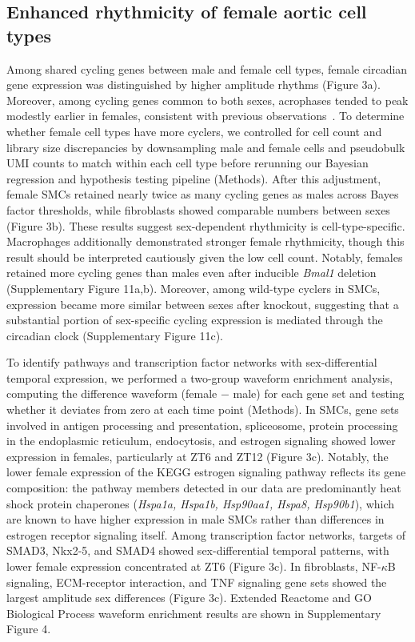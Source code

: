 \documentclass[12pt]{article}
\begin{document}
\subsection*{Enhanced rhythmicity of female aortic cell types}

Among shared cycling genes between male and female cell types, female circadian gene expression was
distinguished by higher amplitude rhythms (Figure 3a). Moreover, among cycling
genes common to both sexes, acrophases tended to peak modestly earlier in females, consistent with
previous observations~\cite{ref21}. To determine whether female cell types have more cyclers, we controlled
for cell count and library size discrepancies by downsampling male and female cells and pseudobulk
UMI counts to match within each cell type before rerunning our Bayesian regression and hypothesis
testing pipeline (Methods). After this adjustment, female SMCs retained
nearly twice as many cycling genes as males across Bayes factor thresholds, while fibroblasts showed
comparable numbers between sexes (Figure 3b). These results suggest sex-dependent
rhythmicity is cell-type-specific. Macrophages additionally demonstrated stronger female
rhythmicity, though this result should be interpreted cautiously given the low cell count. Notably,
females retained more cycling genes than males even after inducible \textit{Bmal1} deletion
(Supplementary Figure 11a,b). Moreover, among wild-type cyclers in SMCs, expression became
more similar between sexes after knockout, suggesting that a substantial portion of sex-specific
cycling expression is mediated through the circadian clock (Supplementary Figure 11c).

To identify pathways and transcription factor networks with sex-differential temporal expression, we
performed a two-group waveform enrichment analysis, computing the difference waveform (female $-$
male) for each gene set and testing whether it deviates from zero at each time point (Methods). In
SMCs, gene sets involved in antigen processing and presentation, spliceosome, protein processing in
the endoplasmic reticulum, endocytosis, and estrogen signaling showed lower expression in females,
particularly at ZT6 and ZT12 (Figure 3c). Notably, the lower female expression of the
KEGG estrogen signaling pathway reflects its gene composition: the pathway members detected in our
data are predominantly heat shock protein chaperones (\textit{Hspa1a, Hspa1b, Hsp90aa1, Hspa8,
Hsp90b1}), which are known to have higher expression in male SMCs rather than differences in estrogen
receptor signaling itself. Among transcription factor networks, targets
of SMAD3, Nkx2-5, and SMAD4 showed sex-differential temporal patterns, with lower female expression
concentrated at ZT6 (Figure 3c). In fibroblasts, NF-$\kappa$B signaling, ECM-receptor
interaction, and TNF signaling gene sets showed the largest amplitude sex differences
(Figure 3c). Extended Reactome and GO Biological Process waveform enrichment results are
shown in Supplementary Figure 4.
\end{document}
